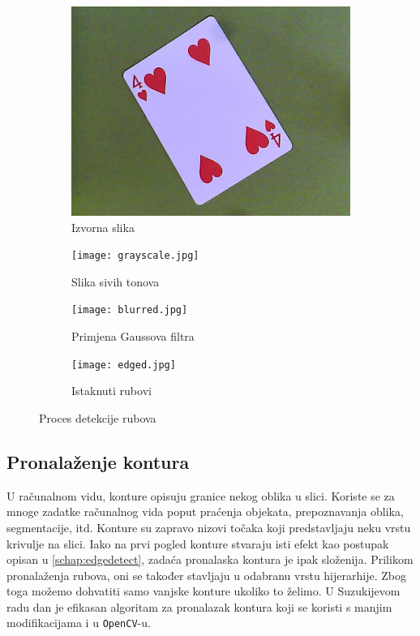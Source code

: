 \documentclass[times, zavrsni, numeric, utf8]{fer}
\newcommand{\code}[1]{\texttt{#1}}
\begin{document}
\begin{figure}[H]
\begin{subfigure}{.5\textwidth}
  \centering
  \includegraphics[width=.8\linewidth]{sve-karte/img13.jpg}
  \caption{Izvorna slika}
  \label{fig:orig4herc}
\end{subfigure}%
\begin{subfigure}{.5\textwidth}
  \centering
  \texttt{[image: grayscale.jpg]}
  \caption{Slika sivih tonova}
  \label{fig:gray}
\end{subfigure}
\begin{subfigure}{.5\textwidth}
  \centering
  \texttt{[image: blurred.jpg]}
  \caption{Primjena Gaussova filtra}
  \label{fig:gaussblur}
\end{subfigure}%
\begin{subfigure}{.5\textwidth}
  \centering
  \texttt{[image: edged.jpg]}
  \caption{Istaknuti rubovi}
  \label{fig:edged}
\end{subfigure}
\caption{Proces detekcije rubova}
\label{fig:canny}
\end{figure}

\subsection{Pronalaženje kontura}
\label{schap:contours}
\hspace*{0.5cm}U računalnom vidu, konture opisuju granice nekog oblika u slici. Koriste se za mnoge zadatke računalnog vida poput praćenja objekata, prepoznavanja oblika, segmentacije, itd. Konture su zapravo nizovi točaka koji predstavljaju neku vrstu krivulje na slici. Iako na prvi pogled konture stvaraju isti efekt kao postupak opisan u \ref{schap:edgedetect}, zadaća pronalaska kontura je ipak složenija. Prilikom pronalaženja rubova, oni se također stavljaju u odabranu vrstu hijerarhije. Zbog toga možemo dohvatiti samo vanjske konture ukoliko to želimo. U Suzukijevom\cite{suzukicontours} radu dan je efikasan algoritam za pronalazak kontura koji se koristi s manjim modifikacijama i u \code{OpenCV}-u\cite{opencv}.
\end{document}
